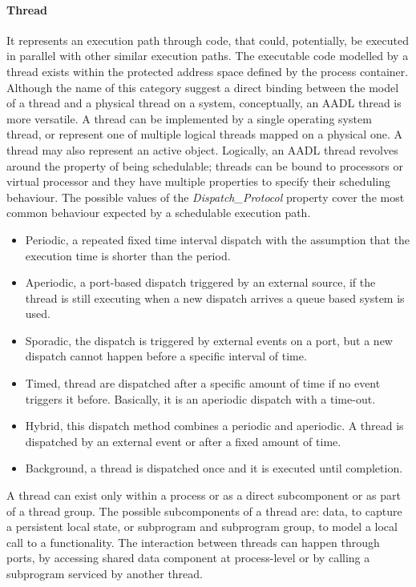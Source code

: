 \paragraph{Thread} It represents an execution path through code, that could, potentially, be executed in parallel with other similar execution paths. The executable code modelled by a thread exists within the protected address space defined by the process container. Although the name of this category suggest a direct binding between the model of a thread and a physical thread on a system, conceptually, an AADL thread is more versatile. A thread can be implemented by a single operating system thread, or represent one of multiple logical threads mapped on a physical one. A thread may also represent an active object. Logically, an AADL thread revolves around the property of being schedulable; threads can be bound to processors or virtual processor and they have multiple properties to specify their scheduling behaviour. The possible values of the \textit{Dispatch\_Protocol} property cover the most common behaviour expected by a schedulable execution path.
\begin{itemize}
\item Periodic, a repeated fixed time interval dispatch with the assumption that the execution time is shorter than the period.
\item Aperiodic, a port-based dispatch triggered by an external source, if the thread is still executing when a new dispatch arrives a queue based system is used.
\item Sporadic, the dispatch is triggered by external events on a port, but a new dispatch cannot happen before a specific interval of time.
\item Timed, thread are dispatched after a specific amount of time if no event triggers it before. Basically, it is an aperiodic dispatch with a time-out.
\item Hybrid, this dispatch method combines a periodic and aperiodic. A thread is dispatched by an external event or after a fixed amount of time.
\item Background, a thread is dispatched once and it is executed until completion.
\end{itemize}
A thread can exist only within a process or as a direct subcomponent or as part of a thread group. The possible subcomponents of a thread are: data, to capture a persistent local state, or subprogram and subprogram group, to model a local call to a functionality. The interaction between threads can happen through ports, by accessing shared data component at process-level or by calling a subprogram serviced by another thread.

